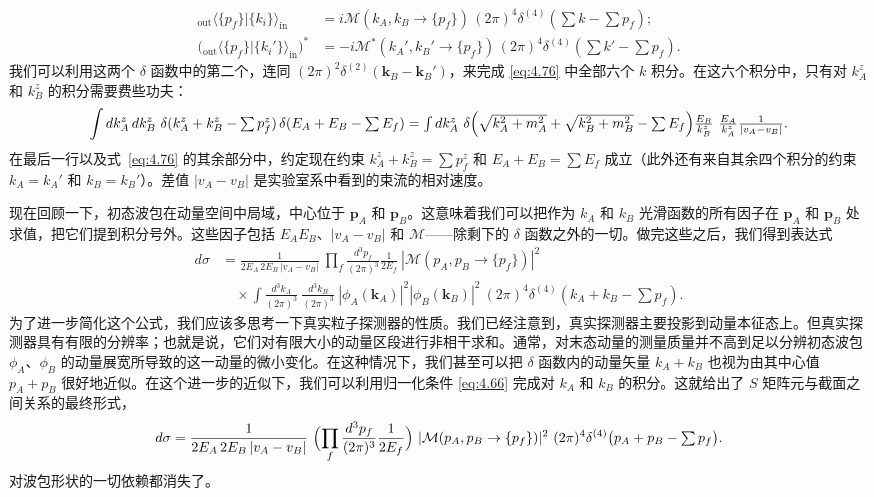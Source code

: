 \begin{align}
  {}_{\mathrm{out}}\langle\{p_f\}|\{k_i\}\rangle_{\mathrm{in}}
    &= i\mathcal{M}(k_A, k_B \to \{p_f\})\,
      (2\pi)^4\delta^{(4)}(\textstyle\sum k - \sum p_f);\\
  \bigl( {}_{\mathrm{out}}\langle\{p_f\}|\{k_i'\}\rangle_{\mathrm{in}} \bigr)^{*}
    &= -i\mathcal{M}^{*}(k_A', k_B' \to \{p_f\})\,
      (2\pi)^4\delta^{(4)}(\textstyle\sum k' - \sum p_f) .
\end{align}
我们可以利用这两个 $\delta$ 函数中的第二个，连同 $(2\pi)^2\delta^{(2)}(\mathbf{k}_B-\mathbf{k}_B')$，来完成 \eqref{eq:4.76} 中全部六个 $k$ 积分。在这六个积分中，只有对 $k_A^z$ 和 $k_B^z$ 的积分需要费些功夫：
\begin{equation}
  \int dk_A^z\,dk_B^z\ \delta(k_A^z+k_B^z-\textstyle\sum p_f^z)\,
    \delta(E_A+E_B-\textstyle\sum E_f)
  = \int dk_A^z\ \delta\Bigl(
    \sqrt{k_A^2+m_A^2} + \sqrt{k_B^2+m_B^2} - \textstyle\sum E_f \Bigr)
    \frac{E_B}{k_B^z}\ \frac{E_A}{k_A^z}
    \frac{1}{|v_A - v_B|} .
  \label{eq:4.77}
\end{equation}
在最后一行以及式~\eqref{eq:4.76} 的其余部分中，约定现在约束 $k_A^z+k_B^z = \sum p_f^z$ 和 $E_A+E_B = \sum E_f$ 成立（此外还有来自其余四个积分的约束 $k_A = k_A'$ 和 $k_B = k_B'$）。差值 $|v_A - v_B|$ 是实验室系中看到的束流的相对速度。

现在回顾一下，初态波包在动量空间中局域，中心位于 $\mathbf{p}_A$ 和 $\mathbf{p}_B$。这意味着我们可以把作为 $k_A$ 和 $k_B$ 光滑函数的所有因子在 $\mathbf{p}_A$ 和 $\mathbf{p}_B$ 处求值，把它们提到积分号外。这些因子包括 $E_AE_B$、$|v_A-v_B|$ 和 $\mathcal{M}$——除剩下的 $\delta$ 函数之外的一切。做完这些之后，我们得到表达式
\begin{equation}
  \begin{aligned}
    d\sigma &= \frac{1}{2E_A\,2E_B\,|v_A-v_B|}\
      \prod_f \frac{d^3p_f}{(2\pi)^3}\frac{1}{2E_f}\
      |\mathcal{M}(p_A,p_B\to\{p_f\})|^2\\
    &\quad \times \int \frac{d^3k_A}{(2\pi)^3}\ \frac{d^3k_B}{(2\pi)^3}\
      |\phi_A(\mathbf{k}_A)|^2|\phi_B(\mathbf{k}_B)|^2\
      (2\pi)^4\delta^{(4)}(k_A+k_B-\textstyle\sum p_f) .
  \end{aligned}
  \label{eq:4.78}
\end{equation}
为了进一步简化这个公式，我们应该多思考一下真实粒子探测器的性质。我们已经注意到，真实探测器主要投影到动量本征态上。但真实探测器具有有限的分辨率；也就是说，它们对有限大小的动量区段进行非相干求和。通常，对末态动量的测量质量并不高到足以分辨初态波包 $\phi_A$、$\phi_B$ 的动量展宽所导致的这一动量的微小变化。在这种情况下，我们甚至可以把 $\delta$ 函数内的动量矢量 $k_A+k_B$ 也视为由其中心值 $p_A+p_B$ 很好地近似。在这个进一步的近似下，我们可以利用归一化条件 \eqref{eq:4.66} 完成对 $k_A$ 和 $k_B$ 的积分。这就给出了 $S$ 矩阵元与截面之间关系的最终形式，
\begin{equation}
  d\sigma = \frac{1}{2E_A\,2E_B\,|v_A-v_B|}\
    \Bigl( \prod_f \frac{d^3p_f}{(2\pi)^3}\frac{1}{2E_f} \Bigr)\
    |\mathcal{M}(p_A,p_B\to\{p_f\})|^2\
    (2\pi)^4\delta^{(4)}\bigl( p_A+p_B-\textstyle\sum p_f \bigr) .
  \label{eq:4.79}
\end{equation}
对波包形状的一切依赖都消失了。

